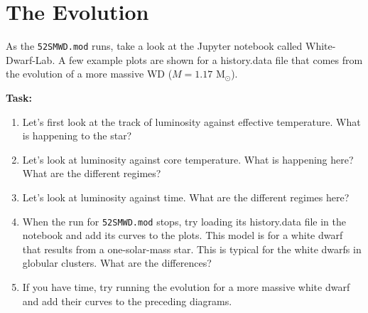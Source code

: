 \documentclass{article}
\begin{document}

\section{The Evolution}

As the \texttt{52SMWD.mod} runs, take a look at the Jupyter notebook called White-Dwarf-Lab. A few example plots are shown for a history.data file that comes from the evolution of a more massive WD ($M=1.17$ M$_\odot$).

\textbf{Task:}\vspace{-1em}
\begin{enumerate}
 \setlength\itemsep{0em}
\item Let's first look at the track of luminosity against effective temperature.  What is happening to the star?
\item Let's look at luminosity against core temperature.  What is happening here?  What are the different regimes?
\item Let's look at luminosity against time.  What are the different regimes here?
\item When the run for \texttt{52SMWD.mod} stops, try loading its history.data file in the notebook and add its curves to the plots. This model is for a white dwarf that results from a one-solar-mass star.  This is typical for the white dwarfs in globular clusters. What are the differences?
\item If you have time, try running the evolution for a more massive white dwarf and add their curves to the preceding diagrams.
\end{enumerate}
\end{document}
